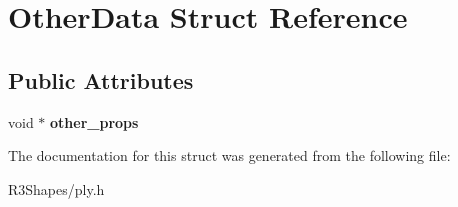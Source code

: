 \hypertarget{struct_other_data}{}\section{Other\+Data Struct Reference}
\label{struct_other_data}
\subsection*{Public Attributes}
\begin{DoxyCompactItemize}
\item 
void $\ast$ {\bfseries other\+\_\+props}\hypertarget{struct_other_data_a21c6a90664f23db87f2e8a91c87b1ac1}{}\label{struct_other_data_a21c6a90664f23db87f2e8a91c87b1ac1}

\end{DoxyCompactItemize}


The documentation for this struct was generated from the following file\+:\begin{DoxyCompactItemize}
\item 
R3\+Shapes/ply.\+h\end{DoxyCompactItemize}
